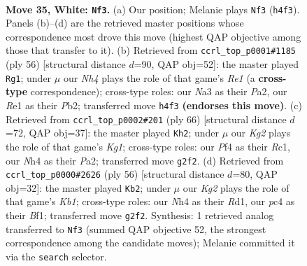 \documentclass[11pt]{article}
\begin{document}
\begin{figure}[p]
\label{fig:thought-m66}
\end{figure}

\clearpage

\begin{figure}[p]\centering
\begin{subfigure}{0.46\textwidth}\centering
\resizebox{\linewidth}{!}{%
\newchessgame
\chessboard[
  setfen={rnb4r/1p4k1/2pqp3/p4p1p/PnpP1P1N/N5P1/1P1QB1KP/4R2R w - - 2 35},
  showmover=false,
  pgfstyle=straightmove, color=movearrow, markmove={h4-f3}
]}
\caption{}
\end{subfigure}\hfill
\begin{subfigure}{0.46\textwidth}\centering
\resizebox{\linewidth}{!}{%
\newchessgame
\chessboard[
  setfen={2b3k1/5rn1/r2p3q/2p2p1p/p1P1pP2/2Q1N1P1/PP1RB2P/4R2K w - - 3 29},
  showmover=false,
  pgfstyle=straightmove, color=movearrow, markmove={e1-g1}
]}
\caption{}
\end{subfigure}
\\[4pt]
\begin{subfigure}{0.46\textwidth}\centering
\resizebox{\linewidth}{!}{%
\newchessgame
\chessboard[
  setfen={1rb1r1k1/3n1pp1/3q4/2pPp2p/1pP1P2P/p2N1PP1/P4QB1/2RR2K1 w - - 1 34},
  showmover=false,
  pgfstyle=straightmove, color=movearrow, markmove={g1-h2}
]}
\caption{}
\end{subfigure}\hfill
\begin{subfigure}{0.46\textwidth}\centering
\resizebox{\linewidth}{!}{%
\newchessgame
\chessboard[
  setfen={1k1n3r/1pr2b2/p2q1pp1/2Np1p2/3P1P1P/1P2Q2R/P1P5/1K1R1B2 w - - 2 29},
  showmover=false,
  pgfstyle=straightmove, color=movearrow, markmove={b1-b2}
]}
\caption{}
\end{subfigure}
\caption{\textbf{Move 35, White: \texttt{Nf3}.} (a) Our position; Melanie plays \texttt{Nf3} (\texttt{h4f3}). Panels (b)--(d) are the retrieved master positions whose correspondence most drove this move (highest QAP objective among those that transfer to it). (b) Retrieved from \texttt{ccrl\_top\_p0001\#1185} (ply 56) [structural distance $d$=90, QAP obj=52]: the master played \texttt{Rg1}; under $\mu$ our \emph{Nh4} plays the role of that game's \emph{Re1} (a \textbf{cross-type} correspondence); cross-type roles: our \emph{N}a3 as their \emph{P}a2, our \emph{R}e1 as their \emph{P}b2; transferred move \texttt{h4f3} \textbf{(endorses this move)}. (c) Retrieved from \texttt{ccrl\_top\_p0002\#201} (ply 66) [structural distance $d$=72, QAP obj=37]: the master played \texttt{Kh2}; under $\mu$ our \emph{Kg2} plays the role of that game's \emph{Kg1}; cross-type roles: our \emph{P}f4 as their \emph{R}c1, our \emph{N}h4 as their \emph{P}a2; transferred move \texttt{g2f2}. (d) Retrieved from \texttt{ccrl\_top\_p0000\#2626} (ply 56) [structural distance $d$=80, QAP obj=32]: the master played \texttt{Kb2}; under $\mu$ our \emph{Kg2} plays the role of that game's \emph{Kb1}; cross-type roles: our \emph{N}h4 as their \emph{R}d1, our \emph{p}c4 as their \emph{B}f1; transferred move \texttt{g2f2}. Synthesis: 1 retrieved analog transferred to \texttt{Nf3} (summed QAP objective 52, the strongest correspondence among the candidate moves); Melanie committed it via the \texttt{search} selector.}
\label{fig:thought-m68}
\end{figure}
\end{document}
